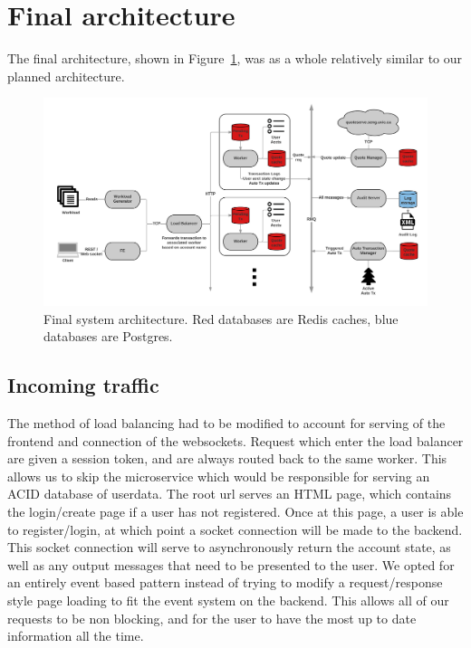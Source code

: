 \section{Final architecture}
The final architecture, shown in Figure~\ref{fig:arch-final}, was as a whole relatively similar to our planned architecture. 

\begin{figure}[tbph]
  \centering
  \includegraphics[width=0.85\linewidth]{graphics/arch-final}
  \caption[Final system architecture]{Final system architecture. Red databases are Redis caches, blue databases are Postgres.}
  \label{fig:arch-final}
\end{figure}

\subsection{Incoming traffic}
The method of load balancing had to be modified to account for serving of the frontend and connection of the websockets. Request which enter the load balancer are given a session token, and are always routed back to the same worker. This allows us to skip the microservice which would be responsible for serving an ACID database of userdata. The root url serves an HTML page, which contains the login/create page if a user has not registered. Once at this page, a user is able to register/login, at which point a socket connection will be made to the backend. This socket connection will serve to asynchronously return the account state, as well as any output messages that need to be presented to the user. We opted for an entirely event based pattern instead of trying to modify a request/response style page loading to fit the event system on the backend. This allows all of our requests to be non blocking, and for the user to have the most up to date information all the time.

